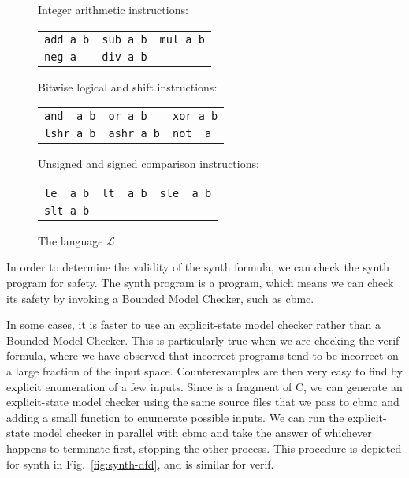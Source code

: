 \begin{figure}
{\small
\begin{center}
\setlength{\tabcolsep}{16pt}
Integer arithmetic instructions:

\begin{tabular}{lll}
 \verb|add a b| & \verb|sub a b| & \verb|mul a b| \\
 \verb|neg a| & \verb|div a b|  & 
\end{tabular}

\medskip

Bitwise logical and shift instructions:

\begin{tabular}{lll}
 \verb|and  a b| & \verb|or a b| & \verb|xor a b| \\
 \verb|lshr a b| & \verb|ashr a b| & \verb|not  a| 
\end{tabular}

\medskip

Unsigned and signed comparison instructions:

\begin{tabular}{lll}
 \verb|le  a b| & \verb|lt  a b| & \verb|sle  a b| \\
 \verb|slt a b| & &
\end{tabular}
\end{center}
}
 \caption{The language $\mathcal{L}$}
 \label{fig:l-language}
\end{figure}



In order to determine the validity of the {\sc synth} formula, we can
check the {\sc synth} program for safety.  The {\sc synth} program is a
\newC program, which means we can check its safety by invoking a Bounded
Model Checker, such as {\sc cbmc}.

In some cases, it is faster to use an explicit-state model checker rather
than a Bounded Model Checker.  This is particularly true when we are checking
the {\sc verif} formula, where we have observed that incorrect programs tend
to be incorrect on a large fraction of the input space.  Counterexamples
are then very easy to find by explicit enumeration of a few inputs.
Since \newC is a fragment of C, we can generate an explicit-state
model checker using the same source files that we pass to {\sc cbmc}
and adding a small function to enumerate possible inputs.
We can run the explicit-state model checker
in parallel with {\sc cbmc} and take the answer of whichever happens
to terminate first, stopping the other process.  This procedure is
depicted for {\sc synth} in Fig.~\ref{fig:synth-dfd}, and is similar for {\sc verif}.

